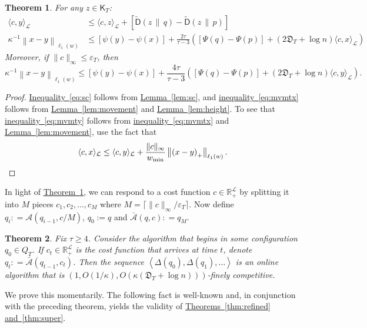 \documentclass[11pt]{article}
\numberwithin{equation}{section}
\newtheorem{theorem}{Theorem}[section]
\theoremstyle{definition}
\theoremstyle{plain}
\newcommand{\R}{\mathbb R}
\newcommand{\expref}[2]{\hyperref[#2]{#1~\ref{#2}}}
\newcommand{\expeqref}[2]{\hyperref[#2]{#1~\eqref{#2}}}
\newcommand{\calA}{\mathcal A}
\newcommand{\calL}{\mathcal L}
\newcommand{\dmid}{\,\|\,}
\newcommand{\eps}{\varepsilon}
\newcommand{\depth}{\mathfrak{D}}
\newcommand{\seteq}{\mathrel{\mathop:}=}
\newcommand{\sfD}{\mathsf D}
\newcommand{\sfK}{\mathsf K}
\newcommand{\tilD}{\tilde{\sfD}}
\newcommand{\llangle}{\left\langle}
\newcommand{\rrangle}{\right\rangle}
\begin{document}
\begin{theorem}\label{thm:analysis}
	For any $z \in \sfK_T$:
	\begin{align}
	\langle c, y\rangle_{\calL} &\leq \langle c,z\rangle_{\calL} + \left[\tilD(z \dmid q) - \tilD(z \dmid p)\right] \label{eq:sc} \\
	\kappa^{-1} \left\|x-y\right\|_{\ell_1(w)} &\leq [\psi(y)-\psi(x)] + \frac{2 \tau}{\tau-3} \left([\Psi(q)-\Psi(p)] + (2\depth_T + \log n) \langle c, x\rangle_{\calL}\right)\label{eq:mvmtx}
	\end{align}
	Moreover, if $\|c\|_{\infty} \leq \eps_T$, then
	\begin{equation}\label{eq:mvmty}
	\kappa^{-1} \left\|x-y\right\|_{\ell_1(w)} \leq [\psi(y)-\psi(x)] + \frac{4 \tau}{\tau-3} \left( [\Psi(q)-\Psi(p)] + (2\depth_T + \log n) \langle c, y\rangle_{\calL}\right).
	\end{equation}
\end{theorem}

\begin{proof}
	\expeqref{Inequality}{eq:sc} follows from \expref{Lemma}{lem:sc}, and \expeqref{inequality}{eq:mvmtx}
	follows from \expref{Lemma}{lem:movement} and \expref{Lemma}{lem:height}.
	To see that \expeqref{inequality}{eq:mvmty} follows from \expeqref{inequality}{eq:mvmtx} and \expref{Lemma}{lem:movement}, use the fact that
	\[
	\langle c,x \rangle_{\calL} \leq \langle c,y\rangle_{\calL} + \frac{\|c\|_{\infty}}{w_{\min}} \left\|\left(x-y\right)_+\right\|_{\ell_1(w)}.\qedhere
	\]
\end{proof}

In light of \expref{Theorem}{thm:analysis}, we can respond to a cost function $c \in \R_+^{\calL}$ by splitting it into $M$ pieces
$c_1,c_2,\ldots,c_M$ where $M = \lceil \|c\|_{\infty}/\eps_T\rceil$.
Now define $q_i \seteq \calA(q_{i-1}, c/M)$, $q_0:=q$ and $\bar{\calA}(q,c) \seteq q_M$.

\begin{theorem}
	\label{thm:main-technical}
	Fix $\tau \geq 4$.
	Consider the algorithm that begins in some configuration $q_0 \in Q_T$.
	If $c_t \in \R_+^{\calL}$ is the cost function that arrives at time $t$,
	denote $q_t \seteq \bar{\calA}(q_{t-1},c_t)$.  Then the sequence
	$\llangle \Delta(q_0), \Delta(q_1), \ldots\rrangle$ is an online algorithm
	that is $(1,O(1/\kappa), O(\kappa(\depth_T + \log n)))$-finely competitive.
\end{theorem}

We prove this momentarily.
The following fact is well-known and, in conjunction with the preceding theorem,
yields the validity of
%
%
\expref{Theorems}{thm:refined} \expref{and}{thm:super}.  %
\end{document}
